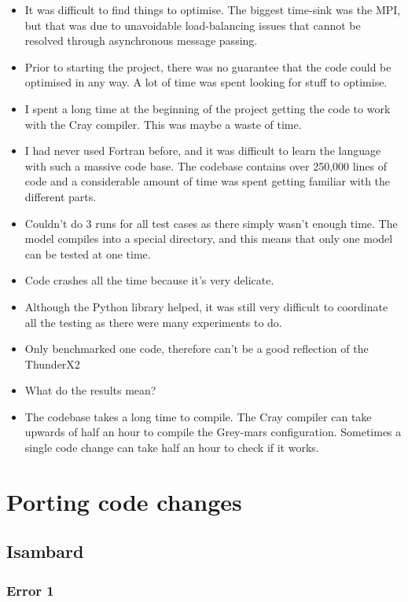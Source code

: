 \documentclass[a4paper,11pt]{report}
\newcommand{\toclesssection}[1]{\section{#1}\addtocounter{section}{1}}
\begin{document}
\begin{itemize}
	\item It was difficult to find things to optimise. The biggest time-sink was the MPI, but that was due to unavoidable load-balancing issues that cannot be resolved through asynchronous message passing. 
	\item Prior to starting the project, there was no guarantee that the code could be optimised in any way. A lot of time was spent looking for stuff to optimise. 
	\item I spent a long time at the beginning of the project getting the code to work with the Cray compiler. This was maybe a waste of time. 
	\item I had never used Fortran before, and it was difficult to learn the language with such a massive code base. The codebase contains over 250,000 lines of code and a considerable amount of time was spent getting familiar with the different parts. 
	\item Couldn't do 3 runs for all test cases as there simply wasn't enough time. The model compiles into a special directory, and this means that only one model can be tested at one time. 
	\item Code crashes all the time because it's very delicate. 
	\item Although the Python library helped, it was still very difficult to coordinate all the testing as there were many experiments to do.
	\item Only benchmarked one code, therefore can't be a good reflection of the ThunderX2
	\item What do the results mean? 
	\item The codebase takes a long time to compile. The Cray compiler can take upwards of half an hour to compile the Grey-mars configuration. Sometimes a single code change can take half an hour to check if it works. 
\end{itemize}









\appendix
\chapter{Porting code changes}

\toclesssection{Isambard}
\subsection{Error 1}
\end{document}

